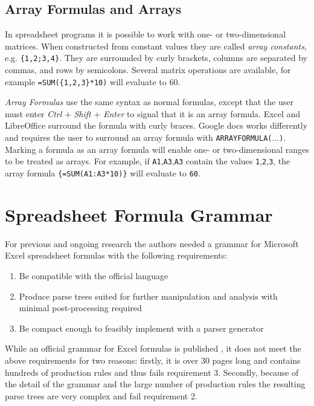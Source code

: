 \documentclass[conference]{IEEEtran}
\begin{document}
\subsection{Array Formulas and Arrays}
\label{sec:arrayformulas}
In spreadsheet programs it is possible to work with one- or two-dimensional matrices. When constructed from constant values they are called \emph{array constants}, e.g. \texttt{\{1,2;3,4\}}.
They are surrounded by curly brackets, columns are separated by commas, and rows by semicolons.
Several matrix operations are available, for example \texttt{=SUM(\{1,2,3\}*10)} will evaluate to 60.

\emph{Array Formulas} use the same syntax as normal formulas, except that the user must enter \emph{Ctrl} + \emph{Shift} + \emph{Enter} to signal that it is an array formula.
Excel and LibreOffice surround the formula with curly braces.
Google docs works differently and requires the user to surround an array formula with \texttt{ARRAYFORMULA($\ldots$)}. Marking a formula as an array formula will enable one- or two-dimensional ranges to be treated as arrays.
For example, if \texttt{A1},\texttt{A3},\texttt{A3} contain the values \texttt{1},\texttt{2},\texttt{3}, the array formula \texttt{\{=SUM(A1:A3*10)\}} will evaluate to \texttt{60}.

\section{Spreadsheet Formula Grammar}
\label{section:grammar}

For previous and ongoing research the authors needed a grammar for Microsoft Excel spreadsheet formulas with the following requirements:

\label{sec:designgoals}
\begin{enumerate}
\item Be compatible with the official language
\item Produce parse trees suited for further manipulation and analysis with minimal post-processing required
\item Be compact enough to feasibly implement with a parser generator
\end{enumerate}

While an official grammar for Excel formulas is published \cite{ExcelOfficialGrammar}, it does not meet the above requirements for two reasons: firstly, it is over 30 pages long and contains hundreds of production rules and thus fails requirement 3.
Secondly, because of the detail of the grammar and the large number of production rules the resulting parse trees are very complex and fail requirement 2.
\end{document}
